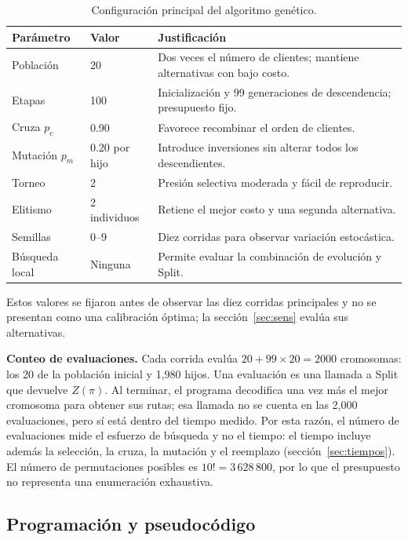 \documentclass[11pt,a4paper]{article}
\numberwithin{equation}{section}
\begin{document}
\begin{table}[H]\centering\small
\caption{Configuración principal del algoritmo genético.}\label{tab:gaparam}
\begin{tabular}{p{4.2cm}p{3cm}p{7.4cm}}\toprule
Parámetro & Valor & Justificación\\\midrule
Población & 20 & Dos veces el número de clientes; mantiene alternativas con bajo costo.\\
Etapas & 100 & Inicialización y 99 generaciones de descendencia; presupuesto fijo.\\
Cruza \(p_c\) & 0.90 & Favorece recombinar el orden de clientes.\\
Mutación \(p_m\) & 0.20 por hijo & Introduce inversiones sin alterar todos los descendientes.\\
Torneo & 2 & Presión selectiva moderada y fácil de reproducir.\\
Elitismo & 2 individuos & Retiene el mejor costo y una segunda alternativa.\\
Semillas & 0--9 & Diez corridas para observar variación estocástica.\\
Búsqueda local & Ninguna & Permite evaluar la combinación de evolución y Split.\\\bottomrule
\end{tabular}
\end{table}

Estos valores se fijaron antes de observar las diez corridas principales y no se presentan como una calibración óptima; la sección~\ref{sec:sens} evalúa sus alternativas.

\textbf{Conteo de evaluaciones.} Cada corrida evalúa \(20+99\times20=2000\) cromosomas: los 20 de la población inicial y 1,980 hijos. Una evaluación es una llamada a Split que devuelve \(Z(\pi)\). Al terminar, el programa decodifica una vez más el mejor cromosoma para obtener sus rutas; esa llamada no se cuenta en las 2,000 evaluaciones, pero sí está dentro del tiempo medido. Por esta razón, el número de evaluaciones mide el esfuerzo de búsqueda y no el tiempo: el tiempo incluye además la selección, la cruza, la mutación y el reemplazo (sección~\ref{sec:tiempos}). El número de permutaciones posibles es \(10!=3\,628\,800\), por lo que el presupuesto no representa una enumeración exhaustiva.

\subsection{Programación y pseudocódigo}
\end{document}
